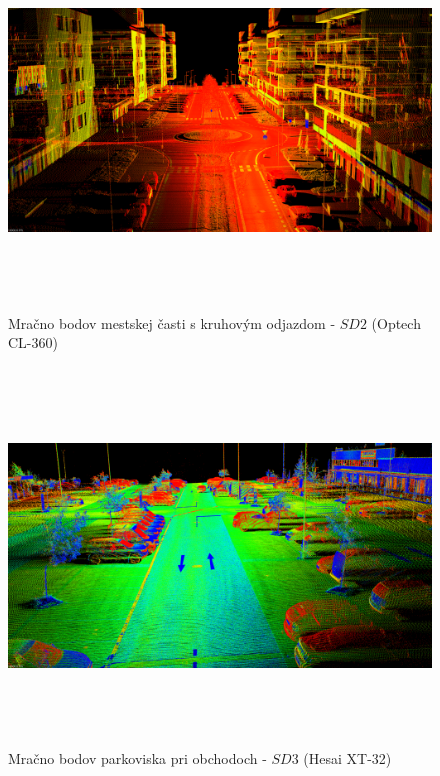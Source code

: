 \begin{figure}[!htbp]
  \centering
  \includegraphics[width=16cm, height=10cm]{img/SD2_example.png}
  \caption{Mračno bodov mestskej časti s kruhovým odjazdom - $SD2$ (Optech CL-360)} 
  \label{fig:SD2}
\end{figure} 

\begin{figure}[!htbp]
  \centering
  \includegraphics[width=16cm, height=10cm]{img/SD3_example.png}
  \caption{Mračno bodov parkoviska pri obchodoch - $SD3$ (Hesai XT-32)} 
  \label{fig:SD3}
\end{figure} 

